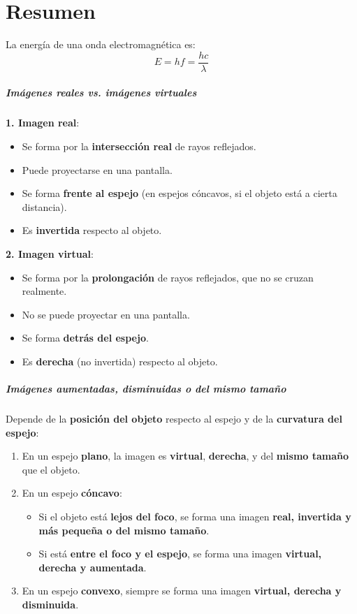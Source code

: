 \section{Resumen}

\begin{tcolorbox}[title=Energía de una onda electromagnética]
  La energía de una onda electromagnética es:
  \[
    E = hf = \frac{hc}{\lambda}
  \]
\end{tcolorbox}

\begin{tcolorbox}[title=Imágenes]
  \subparagraph{Imágenes reales vs. imágenes virtuales}

  \textbf{1. Imagen real}:
  \begin{itemize}
    \item Se forma por la \textbf{intersección real} de rayos reflejados.
    \item Puede proyectarse en una pantalla.
    \item Se forma \textbf{frente al espejo} (en espejos cóncavos, si el objeto está a cierta distancia).
    \item Es \textbf{invertida} respecto al objeto.
  \end{itemize}

  \textbf{2. Imagen virtual}:
  \begin{itemize}
    \item Se forma por la \textbf{prolongación} de rayos reflejados, que no se cruzan realmente.
    \item No se puede proyectar en una pantalla.
    \item Se forma \textbf{detrás del espejo}.
    \item Es \textbf{derecha} (no invertida) respecto al objeto.
  \end{itemize}
  \vspace{5pt}
  \subparagraph{Imágenes aumentadas, disminuidas o del mismo tamaño}

  Depende de la \textbf{posición del objeto} respecto al espejo y de la \textbf{curvatura del espejo}:
  \begin{enumerate}
    \item En un espejo \textbf{plano}, la imagen es \textbf{virtual}, \textbf{derecha}, y del \textbf{mismo tamaño} que el objeto.
    \item En un espejo \textbf{cóncavo}:
      \begin{itemize}
        \item Si el objeto está \textbf{lejos del foco}, se forma una imagen \textbf{real, invertida y más pequeña o del mismo tamaño}.
        \item Si está \textbf{entre el foco y el espejo}, se forma una imagen \textbf{virtual, derecha y aumentada}.
      \end{itemize}
    \item En un espejo \textbf{convexo}, siempre se forma una imagen \textbf{virtual, derecha y disminuida}.
  \end{enumerate}
\end{tcolorbox}
